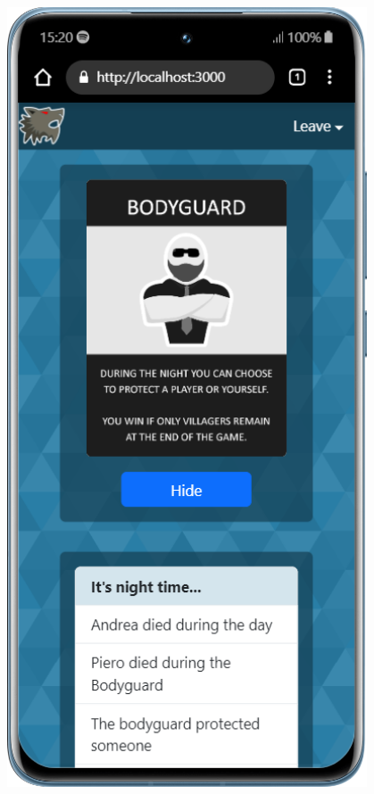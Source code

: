 \begin{figure}[H]
    \centering
    \begin{minipage}{0.25\textwidth}
        \centering
        \includegraphics[width=0.95\textwidth]{img/screen/mobile/dead_mobile.png}

\end{minipage}
\end{figure}

